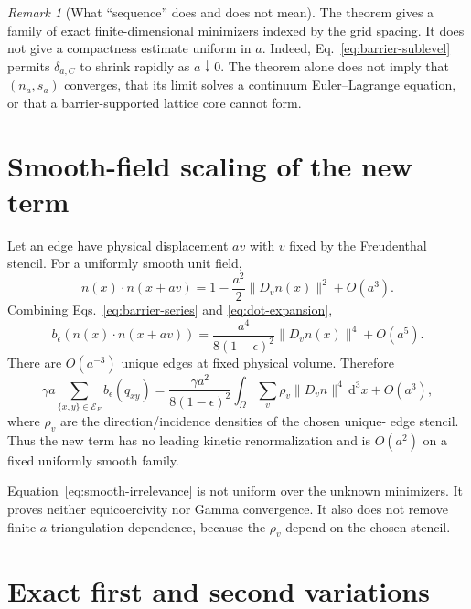 \documentclass[11pt]{article}
\numberwithin{equation}{section}
\theoremstyle{definition}
\theoremstyle{remark}
\newtheorem{remark}[theorem]{Remark}
\newcommand{\cE}{\mathcal E}
\newcommand{\dd}{\mathrm d}
\begin{document}
\begin{remark}[What ``sequence'' does and does not mean]
The theorem gives a family of exact finite-dimensional minimizers indexed by
the grid spacing.  It does not give a compactness estimate uniform in \(a\).
Indeed, Eq.~\eqref{eq:barrier-sublevel} permits
\(\delta_{a,C}\) to shrink rapidly as \(a\downarrow0\).  The theorem alone
does not imply that \((n_a,s_a)\) converges, that its limit solves a continuum
Euler--Lagrange equation, or that a barrier-supported lattice core cannot
form.
\end{remark}

\section{Smooth-field scaling of the new term}

Let an edge have physical displacement \(av\) with \(v\) fixed by the
Freudenthal stencil.  For a uniformly smooth unit field,
\begin{equation}
 n(x)\cdot n(x+av)
 =1-\frac{a^2}{2}\lVert D_vn(x)\rVert^2+O(a^3).
 \label{eq:dot-expansion}
\end{equation}
Combining Eqs.~\eqref{eq:barrier-series} and \eqref{eq:dot-expansion},
\begin{equation}
 b_\epsilon(n(x)\cdot n(x+av))
 =\frac{a^4}{8(1-\epsilon)^2}
 \lVert D_vn(x)\rVert^4+O(a^5).
 \label{eq:edge-expansion}
\end{equation}
There are \(O(a^{-3})\) unique edges at fixed physical volume.  Therefore
\begin{equation}
 \gamma a\sum_{\{x,y\}\in\cE_F}b_\epsilon(q_{xy})
 =\frac{\gamma a^2}{8(1-\epsilon)^2}
 \int_\Omega\sum_v\rho_v\lVert D_vn\rVert^4\,\dd^3x
 +O(a^3),
 \label{eq:smooth-irrelevance}
\end{equation}
where \(\rho_v\) are the direction/incidence densities of the chosen unique-
edge stencil.  Thus the new term has no leading kinetic renormalization and
is \(O(a^2)\) on a fixed uniformly smooth family.

Equation~\eqref{eq:smooth-irrelevance} is not uniform over the unknown
minimizers.  It proves neither equicoercivity nor Gamma convergence.  It also
does not remove finite-\(a\) triangulation dependence, because the
\(\rho_v\) depend on the chosen stencil.

\section{Exact first and second variations}
\end{document}

